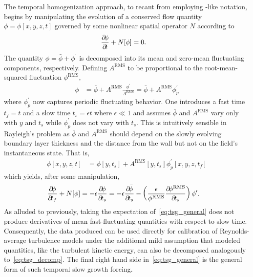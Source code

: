 The temporal homogenization approach, to recant from
\citet{Topalian2014Temporal} employing \citeauthor{Spalart1988Direct}-like
notation, begins by manipulating the evolution of a conserved flow quantity
$\phi = \phi[x,y,z,t]$ governed by some nonlinear spatial operator $N$ according
to
\begin{align}
  \frac{\partial\!{\phi}}{\partial\!{t}} + N[\phi] &= 0.
\end{align}
The quantity $\phi = \bar{\phi} + \phi^\prime$ is decomposed into its mean and
zero-mean fluctuating components, respectively.  Defining $A^\text{RMS}$ to be
proportional to the root-mean-squared fluctuation $\phi^\text{RMS}$,
\begin{align}
 \phi &= \bar{\phi} + A^\text{RMS} \frac{\phi^\prime}{A^\text{RMS}}
       = \bar{\phi} + A^\text{RMS} \phi^\prime_p
\end{align}
where $\phi^\prime_p$ now captures periodic fluctuating behavior.  One
introduces a fast time $t_f = t$ and a slow time $t_s = \epsilon{} t$ where
$\epsilon\ll{}1$ and assumes $\bar{\phi}$ and $A^\text{RMS}$ vary only with
$y$ and $t_s$ while $\phi^\prime_p$ does not vary with $t_s$.  This is
intuitively sensible in Rayleigh's problem as $\bar{\phi}$ and $A^\text{RMS}$
should depend on the slowly evolving boundary layer thickness and the distance
from the wall but not on the field's instantaneous state.  That is,
\begin{align}
 \phi[x,y,z,t] &= \bar{\phi}[y, t_s]
                + A^{\text{RMS}}[y, t_s] \phi^\prime_p[x,y,z,t_f]
  \label{eq:tsg_decomp}
\end{align}
which yields, after some manipulation,
\begin{align}
  \pp{\phi}{t_f} + N[\phi]
  &= -\epsilon \pp{\phi}{t_s}
   = -\epsilon \pp{\bar{\phi}}{t_s}
     -\left( \frac{\epsilon}{\phi^\text{RMS}}
             \pp{\phi^\text{RMS}}{t_s}        \right)\phi^\prime
  \label{eq:tsg_general}.
\end{align}
As alluded to previously, taking the expectation of~\eqref{eq:tsg_general} does
not produce derivatives of mean fast-fluctuating quantities with respect to slow
time.  Consequently, the data produced can be used directly for calibration of
Reynolds-average turbulence models under the additional mild assumption that
modeled quantities, like the turbulent kinetic energy, can also be decomposed
analogously to~\eqref{eq:tsg_decomp}.  The final right hand side
in~\eqref{eq:tsg_general} is the general form of such temporal slow growth
forcing.

